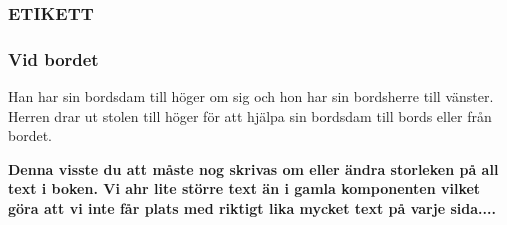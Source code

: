 \newpage

\subsubsection*{ETIKETT}

\subsubsection*{Vid bordet}
Han har sin bordsdam till höger om sig och hon har sin bordsherre till vänster.
Herren drar ut stolen till höger för att hjälpa sin bordsdam till bords eller från bordet. 


\textbf{Denna visste du att måste nog skrivas om eller ändra storleken på all text i boken. Vi ahr lite större text än i gamla komponenten vilket göra att vi inte får plats med riktigt lika mycket text på varje sida....}

